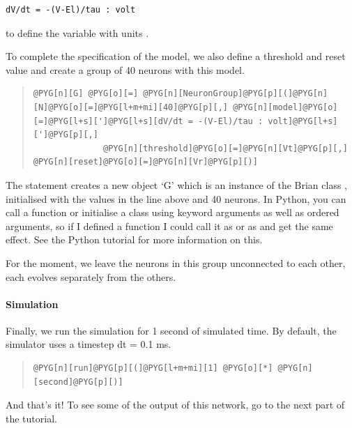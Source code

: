 \documentclass[letterpaper,10pt,english]{manual}
\begin{document}
\begin{Verbatim}[commandchars=@\[\]]
dV/dt = -(V-El)/tau : volt
\end{Verbatim}

to define the variable  with units .

To complete the specification of the model, we also define a threshold and reset
value and create a group of 40 neurons with this model.
\begin{quote}

\begin{Verbatim}[commandchars=@\[\]]
@PYG[n][G] @PYG[o][=] @PYG[n][NeuronGroup]@PYG[p][(]@PYG[n][N]@PYG[o][=]@PYG[l+m+mi][40]@PYG[p][,] @PYG[n][model]@PYG[o][=]@PYG[l+s][']@PYG[l+s][dV/dt = -(V-El)/tau : volt]@PYG[l+s][']@PYG[p][,]
              @PYG[n][threshold]@PYG[o][=]@PYG[n][Vt]@PYG[p][,] @PYG[n][reset]@PYG[o][=]@PYG[n][Vr]@PYG[p][)]
\end{Verbatim}
\end{quote}

The statement creates a new object `G' which is an instance of the
Brian class \hyperlink{brian.NeuronGroup}{}, initialised with the values in the
line above and 40 neurons. In Python, you can call a function or initialise
a class using keyword arguments as well as ordered arguments, so
if I defined a function  I could call it as  or
as  and get the same effect. See the Python tutorial
for more information on this.

For the moment, we leave the neurons in this group unconnected
to each other, each evolves separately from the others.


\paragraph{Simulation}

Finally, we run the simulation for 1 second of simulated time.
By default, the simulator uses a timestep dt = 0.1 ms.
\begin{quote}

\begin{Verbatim}[commandchars=@\[\]]
@PYG[n][run]@PYG[p][(]@PYG[l+m+mi][1] @PYG[o][*] @PYG[n][second]@PYG[p][)]
\end{Verbatim}
\end{quote}

And that's it! To see some of the output of this network, go
to the next part of the tutorial.
\end{document}
